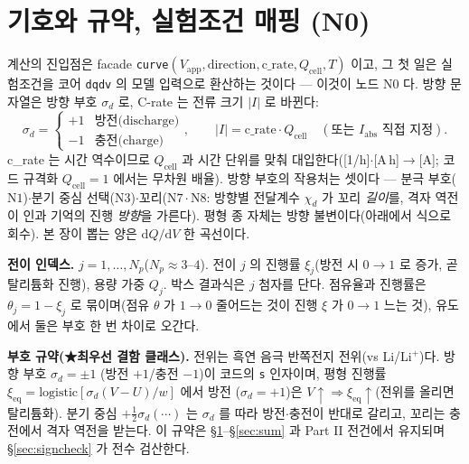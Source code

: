 \documentclass[11pt,a4paper]{article}
\newcommand{\dd}{\mathrm{d}}
\newcommand{\eq}{\mathrm{eq}}
\newcommand{\app}{\mathrm{app}}
\newcommand{\cell}{\mathrm{cell}}
\newcommand{\code}[1]{\texttt{#1}}
\begin{document}
\tableofcontents
\newpage

\section{기호와 규약, 실험조건 매핑 (N0)}\label{sec:notation}
계산의 진입점은 facade \code{curve}$(V_\app,\text{direction},\text{c\_rate},Q_\cell,T)$ 이고, 그 첫 일은 실험조건을
코어 \code{dqdv} 의 모델 입력으로 환산하는 것이다 — 이것이 노드 $\mathrm N0$ 다. 방향 문자열은 방향 부호 $\sigma_d$ 로,
C-rate 는 전류 크기 $|I|$ 로 바뀐다:
\begin{equation}
\sigma_d=\begin{cases}+1 & \text{방전(discharge)}\\ -1 & \text{충전(charge)}\end{cases},
\qquad
|I|=\text{c\_rate}\cdot Q_\cell\quad(\text{또는 }I_\mathrm{abs}\text{ 직접 지정}).
\label{eq:n0map}
\end{equation}
c\_rate 는 시간 역수이므로 $Q_\cell$ 과 시간 단위를 맞춰 대입한다([1/h]$\cdot$[A\,h]$\to$[A]; 코드 규격화
$Q_\cell{=}1$ 에서는 무차원 배율). 방향 부호의 작용처는 셋이다 — 분극 부호($\mathrm N1$)$\cdot$분기 중심 선택($\mathrm N3$)$\cdot$꼬리($\mathrm N7\cdot\mathrm N8$:
방향별 전달계수 $\chi_d$ 가 꼬리 \emph{길이}를, 격자 역전이 인과 기억의 진행 \emph{방향}을 가른다).
평형 종 자체는 방향 불변이다(아래에서 식으로 회수). 본 장이 뽑는 양은 $\dd Q/\dd V$ 한 곡선이다.

\textbf{전이 인덱스.} $j=1,\dots,N_p$($N_p\approx3$--$4$). 전이 $j$ 의 진행률 $\xi_j$(방전 시 $0\to1$ 로 증가, 곧 탈리튬화 진행),
용량 가중 $Q_j$. 박스 결과식은 $j$ 첨자를 단다. 점유율과 진행률은 $\theta_j=1-\xi_j$ 로 묶이며(점유 $\theta$ 가 $1\to0$
줄어드는 것이 진행 $\xi$ 가 $0\to1$ 느는 것), 유도에서 둘은 부호 한 번 차이로 오간다.

\textbf{부호 규약(★최우선 결함 클래스).} 전위는 흑연 음극 반쪽전지 전위(vs Li/Li$^+$)다. 방향 부호 $\sigma_d=\pm1$
(방전 $+1$/충전 $-1$)이 코드의 \code{s} 인자이며, 평형 진행률 $\xi_\eq=\mathrm{logistic}[\sigma_d(V-U)/w]$ 에서 방전
($\sigma_d=+1$)은 $V\!\uparrow\Rightarrow\xi_\eq\!\uparrow$(전위를 올리면 탈리튬화). 분기 중심 $+\tfrac12\sigma_d(\cdots)$
는 $\sigma_d$ 를 따라 방전$\cdot$충전이 반대로 갈리고, 꼬리는 충전에서 격자 역전을 받는다. 이 규약은 \S\ref{sec:notation}--\S\ref{sec:sum}
과 Part II 전건에서 유지되며 \S\ref{sec:signcheck} 가 전수 검산한다.
\end{document}
